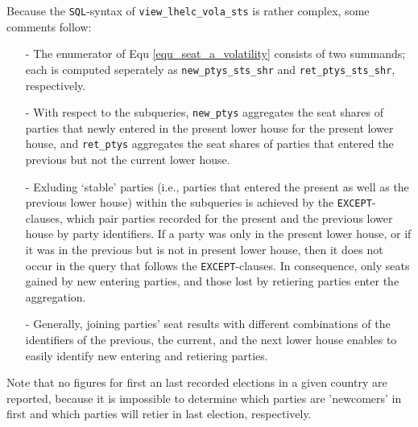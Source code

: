 Because the \texttt{SQL}-syntax of \texttt{view\_lhelc\_vola\_sts} is rather complex, some comments follow:
\begin{itemize}
\item[-]{The enumerator of Equ \ref{equ_seat_a_volatility} consists of two summands; each is computed seperately as \texttt{new\_ptys\_sts\_shr} and \texttt{ret\_ptys\_sts\_shr}, respectively.}
\item[-]{With respect to the subqueries, 
\texttt{new\_ptys} aggregates the seat shares of parties that newly entered in the present lower house for the present lower house, and 
 \texttt{ret\_ptys} aggregates the seat shares of parties that entered the previous but not the current lower house.}
\item[-]{Exluding `stable' parties (i.e., parties that entered the present as well as the previous lower house) within the subqueries is achieved by the \texttt{EXCEPT}-clauses, which pair parties recorded for the present and the previous lower house by party identifiers. If a party was only in the present lower house, or if it was in the previous but is not in present lower house, then it does not occur in the query that follows the \texttt{EXCEPT}-clauses. 
  In consequence, only seats gained by new entering parties, and those lost  by retiering parties enter the aggregation.}
\item[-]{Generally, joining parties' seat results with different combinations of the identifiers of the previous, the current, and the next lower house enables to easily identify new entering and retiering parties.}
\end{itemize}

Note that no figures for first an last recorded elections in a given country are reported, because it is impossible to determine which parties are 'newcomers' in first and which parties will retier in last election, respectively.



